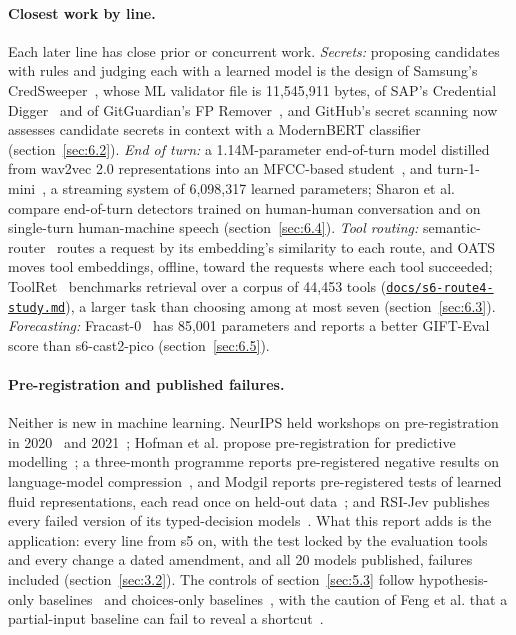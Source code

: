 \documentclass[10pt]{article}
\begin{document}
\paragraph{Closest work by line.} Each later line has close prior or concurrent work. \emph{Secrets:} proposing candidates with rules and judging each with a learned model is the design of Samsung's CredSweeper~\cite{credsweeper}, whose ML validator file is 11,545,911 bytes, of SAP's Credential Digger~\cite{digger} and of GitGuardian's FP Remover~\cite{fpremover}, and GitHub's secret scanning now assesses candidate secrets in context with a ModernBERT classifier~\cite{github2026secret} (section~\ref{sec:6.2}). \emph{End of turn:} a 1.14M-parameter end-of-turn model distilled from wav2vec 2.0 representations into an MFCC-based student~\cite{helwani2026eot}, and turn-1-mini~\cite{turn1mini}, a streaming system of 6,098,317 learned parameters; Sharon et al.~\cite{sharon2026genre} compare end-of-turn detectors trained on human-human conversation and on single-turn human-machine speech (section~\ref{sec:6.4}). \emph{Tool routing:} semantic-router~\cite{semrouter} routes a request by its embedding's similarity to each route, and OATS~\cite{chen2026oats} moves tool embeddings, offline, toward the requests where each tool succeeded; ToolRet~\cite{shi2025toolret} benchmarks retrieval over a corpus of 44,453 tools (\href{https://github.com/maxgfr/skycmd/blob/main/docs/s6-route4-study.md}{\texttt{docs/\allowbreak{}s6-route4-study.md}}), a larger task than choosing among at most seven (section~\ref{sec:6.3}). \emph{Forecasting:} Fracast-0~\cite{zhan2026fracast} has 85,001 parameters and reports a better GIFT-Eval score than s6-cast2-pico (section~\ref{sec:6.5}).

\paragraph{Pre-registration and published failures.} Neither is new in machine learning. NeurIPS held workshops on pre-registration in 2020~\cite{prereg2020} and 2021~\cite{prereg2021}; Hofman et al. propose pre-registration for predictive modelling~\cite{hofman2023prereg}; a three-month programme reports pre-registered negative results on language-model compression~\cite{lu2026prereg}, and Modgil reports pre-registered tests of learned fluid representations, each read once on held-out data~\cite{modgil2026readable}; and RSI-Jev publishes every failed version of its typed-decision models~\cite{rsijev}. What this report adds is the application: every line from s5 on, with the test locked by the evaluation tools and every change a dated amendment, and all 20 models published, failures included (section~\ref{sec:3.2}). The controls of section~\ref{sec:5.3} follow hypothesis-only baselines~\cite{gururangan2018artifacts} and choices-only baselines~\cite{balepur2024artifacts}, with the caution of Feng et al. that a partial-input baseline can fail to reveal a shortcut~\cite{feng2019partial}.
\end{document}
